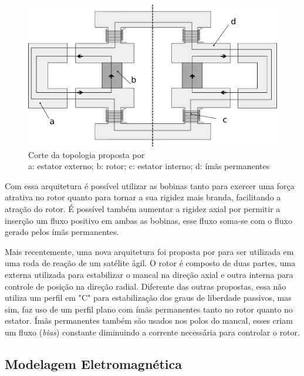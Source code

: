 
\begin{figure}[!ht]
	\centering
	\includegraphics[width=0.8\linewidth]{./Figs/mancais/alemao.pdf}
	\caption{Corte da topologia proposta por \cite{Scharfe2001} \\
	a: estator externo; b: rotor; c: estator interno; d: ímãs permanentes}
	\label{Fig:modelo:alemao}
\end{figure} 

Com essa arquitetura é possível utilizar as bobinas tanto para exercer uma força atrativa no rotor quanto para tornar a sua rigidez mais branda, facilitando a atração do rotor. É possível também aumentar a rigidez axial por permitir a inserção um fluxo positivo em ambas as bobinas, esse fluxo soma-se com o fluxo gerado pelos ímãs permanentes.

Mais recentemente, uma nova arquitetura foi proposta por \citet{Bangcheng2012} para ser utilizada em uma roda de reação de um satélite ágil.  O rotor é composto de duas partes, uma externa utilizada para estabilizar o mancal na direção axial e outra interna para controle de posição na direção radial. Diferente das outras propostas, essa não utiliza um perfil em "C" para estabilização dos graus de liberdade passivos, mas sim, faz uso de um perfil plano com ímãs permanentes tanto no rotor quanto no estator.  Ímãs permanentes também são usados nos polos do mancal, esses criam um fluxo (\textit{bias}) constante diminuindo a corrente necessária para controlar o rotor.
 

\subsection{Modelagem Eletromagnética}

